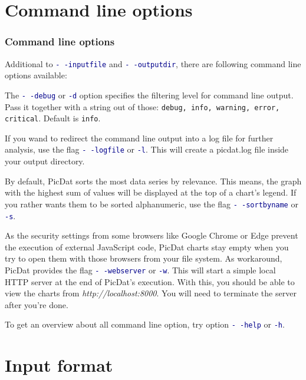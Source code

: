 \documentclass[8pt]{beamer}
\begin{document}
\section{Command line options}
\begin{frame}[label=options]
\frametitle{Command line options}
Additional to \textcolor{darkblue}{\texttt{-\,-inputfile}} and \textcolor{darkblue}{\texttt{-\,-outputdir}}, there are following command line options available:
\bigskip

The \textcolor{darkblue}{\texttt{-\,-debug}} or \textcolor{darkblue}{\texttt{-d}} option specifies the filtering level for command line output. Pass it together with a string out of those: \texttt{debug, info, warning, error, critical}. Default is \texttt{info}.
\bigskip

If you wand to redirect the command line output into a log file for further analysis, use the flag \textcolor{darkblue}{\texttt{-\,-logfile}} or \textcolor{darkblue}{\texttt{-l}}. This will create a picdat.log file inside your output directory.
\bigskip

By default, PicDat sorts the most data series by relevance. This means, the graph with the highest sum of values will be displayed at the top of a chart's legend. If you rather wants them to be sorted alphanumeric, use the flag \textcolor{darkblue}{\texttt{-\,-sortbyname}} or \textcolor{darkblue}{\texttt{-s}}.
\bigskip

As the security settings from some browsers like Google Chrome or Edge prevent the execution of external JavaScript code, PicDat charts stay empty when you try to open them with those browsers from your file system. As workaround, PicDat provides the flag \textcolor{darkblue}{\texttt{-\,-webserver}} or \textcolor{darkblue}{\texttt{-w}}. This will start a simple local HTTP server at the end of PicDat's execution. With this, you should be able to view the charts from \textit{http://localhost:8000}. You will need to terminate the server after you're done.
\bigskip

To get an overview about all command line option, try option \textcolor{darkblue}{\texttt{-\,-help}} or \textcolor{darkblue}{\texttt{-h}}.
\end{frame}

\section{Input format}
\end{document}
